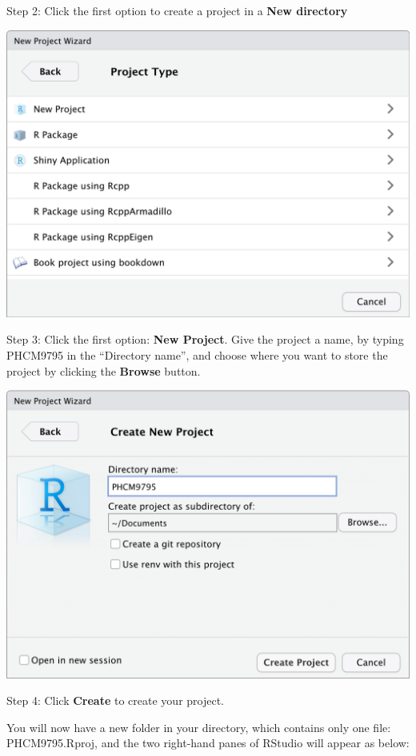 \documentclass[
]{memoir}
\begin{document}
Step 2: Click the first option to create a project in a \textbf{New directory}

\includegraphics[width=0.75\linewidth]{img/NewProject-2}

Step 3: Click the first option: \textbf{New Project}. Give the project a name, by typing PHCM9795 in the ``Directory name'', and choose where you want to store the project by clicking the \textbf{Browse} button.

\includegraphics[width=0.75\linewidth]{img/NewProject-3}

Step 4: Click \textbf{Create} to create your project.

You will now have a new folder in your directory, which contains only one file: PHCM9795.Rproj, and the two right-hand panes of RStudio will appear as below:
\end{document}

